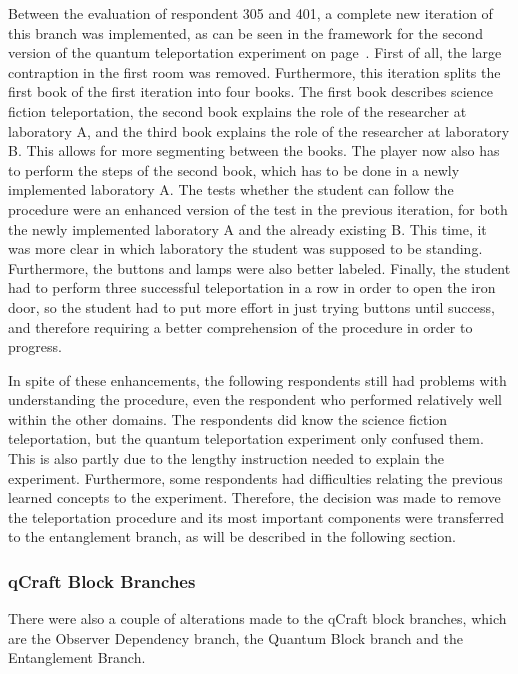 \documentclass[11pt,twoside]{report} %
\begin{document}
Between the evaluation of respondent 305 and 401, a complete new iteration of this branch was implemented, as can be seen in the framework for the second version of the quantum teleportation experiment on page~\pageref{app:teleportation2}. First of all, the large contraption in the first room was removed. Furthermore, this iteration splits the first book of the first iteration into four books. The first book describes science fiction teleportation, the second book explains the role of the researcher at laboratory A, and the third book explains the role of the researcher at laboratory B. This allows for more segmenting between the books. The player now also has to perform the steps of the second book, which has to be done in a newly implemented laboratory A. The tests whether the student can follow the procedure were an enhanced version of the test in the previous iteration, for both the newly implemented laboratory A and the already existing B. This time, it was more clear in which laboratory the student was supposed to be standing. Furthermore, the buttons and lamps were also better labeled. Finally, the student had to perform three successful teleportation in a row in order to open the iron door, so the student had to put more effort in just trying buttons until success, and therefore requiring a better comprehension of the procedure in order to progress.

In spite of these enhancements, the following respondents still had problems with understanding the procedure, even the respondent who performed relatively well within the other domains. The respondents did know the science fiction teleportation, but the quantum teleportation experiment only confused them. This is also partly due to the lengthy instruction needed to explain the experiment. Furthermore, some respondents had difficulties relating the previous learned concepts to the experiment. Therefore, the decision was made to remove the teleportation procedure and its most important components were transferred to the entanglement branch, as will be described in the following section.

\subsubsection{qCraft Block Branches}

There were also a couple of alterations made to the qCraft block branches, which are the Observer Dependency branch, the Quantum Block branch and the Entanglement Branch.
\end{document}
